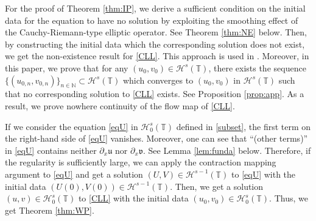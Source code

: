 \documentclass[%
11pt,  reqno]{amsart}
\newcommand{\T}{\mathbb{T}}
\newcommand{\N}{\mathbb{N}}
\renewcommand{\H}{\mathcal H}
\newcommand{\uu}{\mathfrak u}
\newcommand{\fv}{\mathfrak v}
\newcommand{\dx}{\partial_x}
\numberwithin{equation}{section}
\numberwithin{theorem}{section}
\begin{document}
For the proof of Theorem \ref{thm:IP},
we derive a sufficient condition on the initial data for the equation to have no solution 
by exploiting the smoothing effect of the Cauchy-Riemann-type elliptic operator.
See Theorem \ref{thm:NE} below.
Then, by constructing the initial data which the corresponding solution does not exist,
we get the non-existence result for \eqref{CLL}.
This approach is used in \cite{KiTs18, KoOk25b}.
Moreover, in this paper, we prove that for any $(u_0, v_0) \in \H^s(\T)$,   
there exists the sequence $\{ (u_{0,n}, v_{0,n}) \}_{n \in \N} \subset \H^s(\T)$
which converges to $(u_0, v_0)$ in $\H^s(\T)$ such that 
no corresponding solution to \eqref{CLL} exists.
See Proposition \ref{prop:app}.
As a result, we prove nowhere continuity of the flow map of \eqref{CLL}.

If we consider the equation \eqref{eqU} in $\H_0^s(\T)$ defined in \eqref{subset},
the first term on the right-hand side of \eqref{eqU} vanishes.
Moreover, one can see that ``(other terms)'' in \eqref{eqU} contains neither
$\dx \uu$ nor $\dx \fv$. See Lemma \ref{lem:funda} below. 
Therefore, 
if the regularity is sufficiently large,
we can apply the contraction mapping argument to \eqref{eqU}
and get a solution $(U, V) \in \H^{s-1}(\T)$ to \eqref{eqU} with the initial data 
$(U(0), V(0)) \in \H^{s-1}(\T)$.   
Then, we get a solution $(u,v) \in \H_0^s(\T)$ to \eqref{CLL} with
the initial data $(u_0, v_0) \in \H_0^s(\T)$.
Thus, we get Theorem \ref{thm:WP}.
\end{document}
